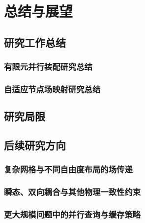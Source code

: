 \chapter{总结与展望}
\label{chap:conclusion}

\section{研究工作总结}
\subsection{有限元并行装配研究总结}
\thesisdraftnote

\subsection{自适应节点场映射研究总结}
\thesisdraftnote

\section{研究局限}
\thesisdraftnote

\section{后续研究方向}
\subsection{复杂网格与不同自由度布局的场传递}
\thesisdraftnote

\subsection{瞬态、双向耦合与其他物理一致性约束}
\thesisdraftnote

\subsection{更大规模问题中的并行查询与缓存策略}
\thesisdraftnote

